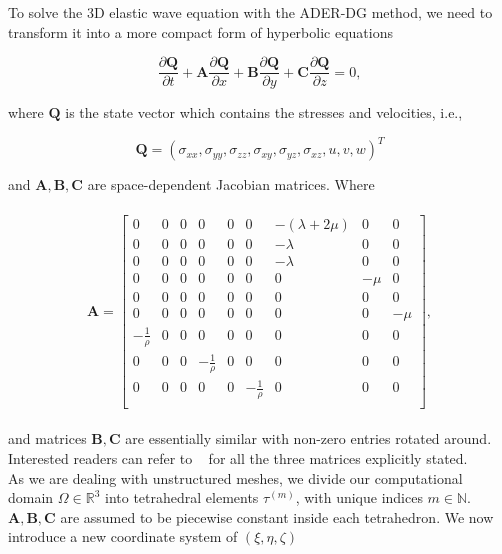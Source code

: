 To solve the 3D elastic wave equation with the \ac{ADER}-\ac{DG} method, we need to transform it into a more compact form of hyperbolic equations

\begin{equation}
    \frac{\partial \mathbf{Q}}{\partial t} + \mathbf{A} \frac{\partial \mathbf{Q}}{\partial x} + 
    \mathbf{B} \frac{\partial \mathbf{Q}}{\partial y} + \mathbf{C} \frac{\partial \mathbf{Q}}{\partial z} = 0,
\end{equation}

where $\mathbf{Q}$ is the state vector which contains the stresses and velocities, i.e.,

\begin{equation}
    \mathbf{Q} = \left(\sigma_{xx}, \sigma_{yy}, \sigma_{zz}, \sigma_{xy}, \sigma_{yz}, \sigma_{xz}, u, v, w \right)^T
\end{equation}

and $\mathbf{A}, \mathbf{B}, \mathbf{C}$ are space-dependent Jacobian matrices. Where

\begin{align}
    \begin{split}
    \mathbf{A} = 
        \begin{bmatrix}
        0 & 0 & 0 & 0 & 0 & 0 & -\left(\lambda + 2\mu\right) & 0 & 0 \\
        0 & 0 & 0 & 0 & 0 & 0 & -\lambda                     & 0 & 0 \\
        0 & 0 & 0 & 0 & 0 & 0 & -\lambda                     & 0 & 0 \\
        0 & 0 & 0 & 0 & 0 & 0 & 0                   & -\mu & 0 \\
        0 & 0 & 0 & 0 & 0 & 0 & 0                   & 0 & 0 \\
        0 & 0 & 0 & 0 & 0 & 0 & 0                   & 0 & -\mu \\
        -\frac{1}{\rho} & 0 & 0 & 0 & 0 & 0 & 0                   & 0 & 0 \\
        0 & 0 & 0 & -\frac{1}{\rho} & 0 & 0 & 0                   & 0 & 0 \\
        0 & 0 & 0 & 0 & 0 & -\frac{1}{\rho} & 0                   & 0 & 0 \\
    \end{bmatrix},
    \end{split}
\end{align}

and matrices $\mathbf{B}, \mathbf{C}$ are essentially similar with non-zero entries rotated around. Interested readers can refer to
~\parencite{dumbser1} for all the three matrices explicitly stated. \\

As we are dealing with unstructured meshes, we divide our computational domain $\Omega \in \mathbb{R}^3$ into tetrahedral elements 
$\tau^{\left(m\right)}$, with unique indices $m\in\mathbb{N}$. $\mathbf{A}, \mathbf{B}, \mathbf{C}$ are assumed to be piecewise constant
inside each tetrahedron. We now introduce a new coordinate system of $\left(\xi, \eta, \zeta \right)$